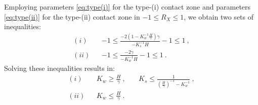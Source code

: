 \documentclass[a4paper,10pt]{article}
\begin{document}
Employing parameters \eqref{eq:type(i)} for the type-(i) contact zone and parameters \eqref{eq:type(ii)} for the type-(ii) contact zone in $-1\le R_{X}\le 1$, we obtain two sets of inequalities: 
\begin{equation}
\begin{aligned}
(i)&& -1\le \frac{-2(1-K_w^{-1}\frac{H}{\gamma})\gamma}{-K_s^{-1} H}-1\le 1~,\\
(ii)&& -1\le \frac{-2\gamma}{-K_w^{-1}H}-1\le 1~.
\end{aligned}
\end{equation}
Solving these inequalities results in:
\begin{equation}
\begin{aligned}
(i) && K_w\ge \frac{H}{\gamma}~,~ && K_s\le \frac{1}{(\frac{H}{\gamma})^{-1}-K_w^{-1}}~, \\
(ii) && K_w\le \frac{H}{\gamma}~.
\end{aligned}
\end{equation}
\end{document}
